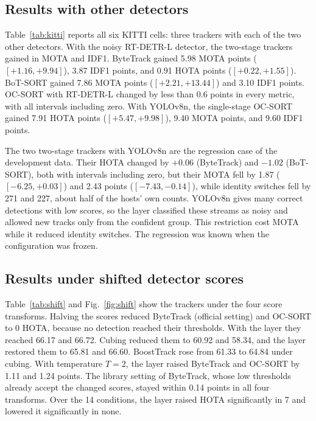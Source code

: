\subsection{Results with other detectors}\label{sec:detector}
Table~\ref{tab:kitti} reports all six KITTI cells: three trackers with each of
the two other detectors. With the noisy RT-DETR-L detector, the two-stage
trackers gained in MOTA and IDF1. ByteTrack gained 5.98 MOTA points
($[+1.16,+9.94]$), 3.87 IDF1 points, and 0.91 HOTA points
($[+0.22,+1.55]$). BoT-SORT gained 7.86 MOTA points ($[+2.21,+13.44]$) and
3.10 IDF1 points. OC-SORT with RT-DETR-L changed by less than 0.6 points in
every metric, with all intervals including zero. With YOLOv8n, the
single-stage OC-SORT gained 7.91 HOTA points ($[+5.47,+9.98]$), 9.40 MOTA
points, and 9.60 IDF1 points.

The two two-stage trackers with YOLOv8n are the regression case of the
development data. Their HOTA changed by $+0.06$ (ByteTrack) and $-1.02$
(BoT-SORT), both with intervals including zero, but their MOTA fell by 1.87
($[-6.25,+0.03]$) and 2.43 points ($[-7.43,-0.14]$), while identity switches
fell by 271 and 227, about half of the hosts' own counts. YOLOv8n gives many
correct detections with low scores, so the layer classified these streams as
noisy and allowed new tracks only from the confident group. This restriction
cost MOTA while it reduced identity switches. The regression was known when
the configuration was frozen.



\subsection{Results under shifted detector scores}\label{sec:shift}
Table~\ref{tab:shift} and Fig.~\ref{fig:shift} show the trackers under the
four score transforms. Halving the scores reduced ByteTrack (official setting)
and OC-SORT to 0 HOTA, because no detection reached their thresholds. With the
layer they reached 66.17 and 66.72. Cubing reduced them to 60.92 and 58.34,
and the layer restored them to 65.81 and 66.60. BoostTrack rose from 61.33 to
64.84 under cubing. With temperature $T=2$, the layer raised ByteTrack and
OC-SORT by 1.11 and 1.24 points. The library setting of ByteTrack, whose low
thresholds already accept the changed scores, stayed within 0.14 points in all
four transforms. Over the 14 conditions, the layer raised HOTA significantly
in 7 and lowered it significantly in none.

